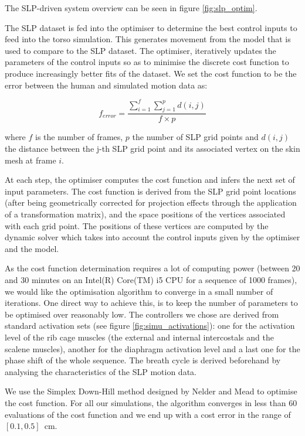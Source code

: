 The SLP-driven system overview can be seen in figure \ref{fig:slp_optim}.

The SLP dataset is fed into the optimiser to determine the best control inputs to feed into the torso simulation. This generates movement from the model that is used to compare to the SLP dataset. The optimiser, iteratively updates the parameters of the control inputs so as to minimise the discrete cost function to produce increasingly better fits of the dataset. We set the cost function to be the error between the human and simulated motion data as:

\begin{equation} \label{eq:cost_fct} f_{error} =  \frac{
\displaystyle\sum\limits_{i=1}^f \displaystyle\sum\limits_{j=1}^p d(i,j)}
{
f \times p
}
\end{equation}

where $ f $ is the number of frames, $ p $ the number of SLP grid points and $ d(i,j) $ the distance between the j-th SLP grid point and its associated vertex on the skin mesh at frame $ i $.

At each step, the optimiser computes the cost function and infers the next set of input parameters. The cost function is derived from the SLP grid point locations (after being geometrically corrected for projection effects through the application of a transformation matrix), and the space positions of the vertices associated with each grid point. The positions of these vertices are computed by the dynamic solver which takes into account the control inputs given by the optimiser and the model. 

As the cost function determination requires a lot of computing power (between 20 and 30 minutes on an Intel(R) Core(TM) i5 CPU for a sequence of 1000 frames), we would like the optimisation algorithm to converge in a small number of iterations. One direct way to achieve this, is to keep the number of parameters to be optimised over reasonably low. The controllers we chose are derived from standard activation sets (see figure \ref{fig:simu_activations}): one for the activation level of the rib cage muscles (the external and internal intercostals and the scalene muscles), another for the diaphragm activation level and a last one for the phase shift of the whole sequence. The breath cycle is derived beforehand by analysing the characteristics of the SLP motion data.

We use the Simplex Down-Hill method designed by Nelder and Mead \cite{nelder1965simplex} to optimise the cost function. For all our simulations, the algorithm converges in less than 60 evaluations of the cost function and we end up with a cost error in the range of $[0.1, 0.5]$~cm.

